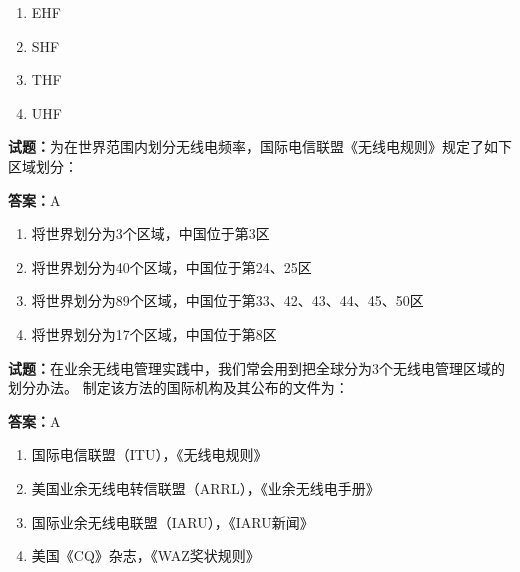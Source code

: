 \documentclass{ctexbook}
\begin{document}
\begin{enumerate}[leftmargin=3em]
  \item EHF 

  \item SHF 

  \item THF 

  \item UHF 

\end{enumerate}





\vspace{1em}

\textbf{试题：}为在世界范围内划分无线电频率，国际电信联盟《无线电规则》规定了如下区域划分： 

\textbf{答案：}A 

\begin{enumerate}[leftmargin=3em]
  \item 将世界划分为3个区域，中国位于第3区 

  \item 将世界划分为40个区域，中国位于第24、25区 

  \item 将世界划分为89个区域，中国位于第33、42、43、44、45、50区 

  \item 将世界划分为17个区域，中国位于第8区 

\end{enumerate}





\vspace{1em}

\textbf{试题：}在业余无线电管理实践中，我们常会用到把全球分为3个无线电管理区域的划分办法。
制定该方法的国际机构及其公布的文件为： 

\textbf{答案：}A 

\begin{enumerate}[leftmargin=3em]
  \item 国际电信联盟（ITU），《无线电规则》 

  \item 美国业余无线电转信联盟（ARRL），《业余无线电手册》 

  \item 国际业余无线电联盟（IARU），《IARU新闻》 

  \item 美国《CQ》杂志，《WAZ奖状规则》 

\end{enumerate}
\end{document}
